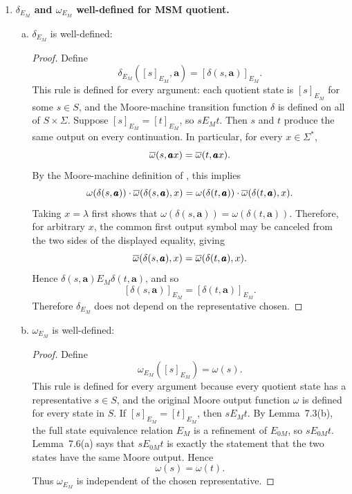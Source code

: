 \begin{enumerate}[{7.}1.]
\item \textbf{$\delta_{E_M}$ and $\omega_{E_M}$ well-defined for MSM quotient.}

\begin{enumerate}[(a)]
  \item $\delta_{E_M}$ is well-defined:

  \begin{proof}
  Define
  \[
    \delta_{E_M}([s]_{E_M},\pmb{a})=[\delta(s,\pmb{a})]_{E_M}.
  \]
  This rule is defined for every argument: each quotient state is $[s]_{E_M}$
  for some $s\in S$, and the Moore-machine transition function $\delta$ is
  defined on all of $S\times\Sigma$.
  Suppose $[s]_{E_M}=[t]_{E_M}$, so $s E_M t$.  Then $s$ and $t$ produce the
  same output on every continuation.  In particular, for every
  $x\in\Sigma^*$,
  \[
    \overline{\omega}(s,\pmb{a}x)=\overline{\omega}(t,\pmb{a}x).
  \]
  By the Moore-machine definition of \OBAR, this implies
  \[
    \omega(\delta(s,\pmb{a}))\cdot\overline{\omega}(\delta(s,\pmb{a}),x)
    =
    \omega(\delta(t,\pmb{a}))\cdot\overline{\omega}(\delta(t,\pmb{a}),x).
  \]
  Taking $x=\lambda$ first shows that
  $\omega(\delta(s,\pmb{a}))=\omega(\delta(t,\pmb{a}))$.  Therefore, for
  arbitrary $x$, the common first output symbol may be canceled from the two
  sides of the displayed equality, giving
  \[
    \overline{\omega}(\delta(s,\pmb{a}),x)=\overline{\omega}(\delta(t,\pmb{a}),x).
  \]
  Hence $\delta(s,\pmb{a}) E_M \delta(t,\pmb{a})$, and so
  \[
    [\delta(s,\pmb{a})]_{E_M}=[\delta(t,\pmb{a})]_{E_M}.
  \]
  Therefore $\delta_{E_M}$ does not depend on the representative chosen.
  \end{proof}

  \item $\omega_{E_M}$ is well-defined:

  \begin{proof}
  Define
  \[
    \omega_{E_M}([s]_{E_M})=\omega(s).
  \]
  This rule is defined for every argument because every quotient state has a
  representative $s\in S$, and the original Moore output function $\omega$ is
  defined for every state in $S$.
  If $[s]_{E_M}=[t]_{E_M}$, then $s E_M t$.  By Lemma~7.3(b), the full state
  equivalence relation $E_M$ is a refinement of $E_{0M}$, so $s E_{0M} t$.
  Lemma~7.6(a) says that $s E_{0M} t$ is exactly the statement that the two
  states have the same Moore output.  Hence
  \[
    \omega(s)=\omega(t).
  \]
  Thus $\omega_{E_M}$ is independent of the chosen representative.
  \end{proof}
\end{enumerate}


\end{enumerate}
